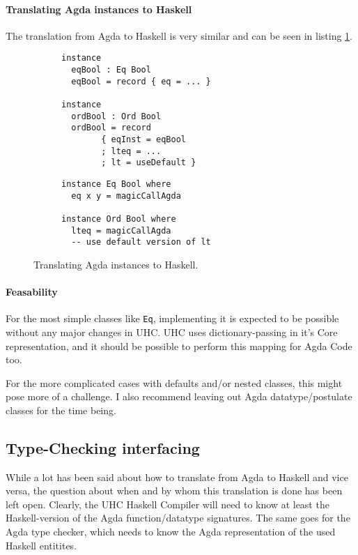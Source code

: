 \documentclass[12pt, a4paper, twoside]{report}
\begin{document}
\paragraph{Translating Agda instances to Haskell}
The translation from Agda to Haskell is very similar and can be seen in listing \ref{lst:inst-agda-hs}.
\begin{figure}
\begin{subfigure}[b]{0.5\textwidth}
\begin{lstlisting}
instance
  eqBool : Eq Bool
  eqBool = record { eq = ... }

instance
  ordBool : Ord Bool
  ordBool = record
        { eqInst = eqBool
        ; lteq = ...
        ; lt = useDefault }
\end{lstlisting}
\end{subfigure}
\hspace{10pt}
\begin{subfigure}[b]{0.5\textwidth}
\begin{lstlisting}
instance Eq Bool where
  eq x y = magicCallAgda

instance Ord Bool where
  lteq = magicCallAgda
  -- use default version of lt
\end{lstlisting}
\end{subfigure}
\caption{Translating Agda instances to Haskell.}
\label{lst:inst-agda-hs}
\end{figure}


\paragraph{Feasability}
For the most simple classes like \texttt{Eq}, implementing it is expected to be
possible without any major changes in UHC. UHC uses dictionary-passing in it's Core representation,
and it should be possible to perform this mapping for Agda Code too.

For the more complicated cases with defaults and/or nested classes, this might pose more of a challenge.
I also recommend leaving out Agda datatype/postulate classes for the time being.

\subsection{Type-Checking interfacing}
While a lot has been said about how to translate from Agda to Haskell and vice versa,
the question about when and by whom this translation is done has been left open. Clearly,
the UHC Haskell Compiler will need to know at least the Haskell-version of the Agda
function/datatype signatures. The same goes for the Agda type checker, which needs to
know the Agda representation of the used Haskell entitites.
\end{document}
